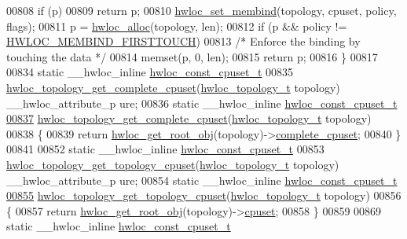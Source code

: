 \begin{DoxyCode}
{{00808   \textcolor{keywordflow}{if} (p)
00809     \textcolor{keywordflow}{return} p;
00810   \hyperlink{a00050_ga8b6d1d90227aff8e44ef26bc1f8a8f95}{hwloc_set_membind}(topology, cpuset, policy, flags);
00811   p = \hyperlink{a00050_gac5586e58cf25c3596b7d4aa31ce13259}{hwloc_alloc}(topology, len);
00812   \textcolor{keywordflow}{if} (p && policy != \hyperlink{a00050_ggac9764f79505775d06407b40f5e4661e8a979c7aa78dd32780858f30f47a72cca0}{HWLOC_MEMBIND_FIRSTTOUCH})
00813     \textcolor{comment}{/* Enforce the binding by touching the data */}
00814     memset(p, 0, len);
00815   \textcolor{keywordflow}{return} p;
00816 \}
00817 
00834 \textcolor{keyword}{static} \_\_hwloc\_inline \hyperlink{a00040_ga1f784433e9b606261f62d1134f6a3b25}{hwloc_const_cpuset_t}
00835 \hyperlink{a00060_ga418ebb39eaf1eac8f9cf4047cf59a534}{hwloc_topology_get_complete_cpuset}(\hyperlink{a00039_ga9d1e76ee15a7dee158b786c30b6a6e38}{hwloc_topology_t} topology) \_\_hwloc\_attribute\_p
      ure;
00836 \textcolor{keyword}{static} \_\_hwloc\_inline \hyperlink{a00040_ga1f784433e9b606261f62d1134f6a3b25}{hwloc_const_cpuset_t}
\hypertarget{a00031_source_l00837}{}\hyperlink{a00060_ga418ebb39eaf1eac8f9cf4047cf59a534}{00837} \hyperlink{a00060_ga418ebb39eaf1eac8f9cf4047cf59a534}{hwloc_topology_get_complete_cpuset}(\hyperlink{a00039_ga9d1e76ee15a7dee158b786c30b6a6e38}{hwloc_topology_t} topology)
00838 \{
00839   \textcolor{keywordflow}{return} \hyperlink{a00053_gadbf58f6e187efbdb3cd9a8e30311b7d7}{hwloc_get_root_obj}(topology)->\hyperlink{a00016_a91788a9da687beb7224cc1fd7b75208c}{complete_cpuset};
00840 \}
00841 
00852 \textcolor{keyword}{static} \_\_hwloc\_inline \hyperlink{a00040_ga1f784433e9b606261f62d1134f6a3b25}{hwloc_const_cpuset_t}
00853 \hyperlink{a00060_gaa319133e702fea664750c45735ac8a25}{hwloc_topology_get_topology_cpuset}(\hyperlink{a00039_ga9d1e76ee15a7dee158b786c30b6a6e38}{hwloc_topology_t} topology) \_\_hwloc\_attribute\_p
      ure;
00854 \textcolor{keyword}{static} \_\_hwloc\_inline \hyperlink{a00040_ga1f784433e9b606261f62d1134f6a3b25}{hwloc_const_cpuset_t}
\hypertarget{a00031_source_l00855}{}\hyperlink{a00060_gaa319133e702fea664750c45735ac8a25}{00855} \hyperlink{a00060_gaa319133e702fea664750c45735ac8a25}{hwloc_topology_get_topology_cpuset}(\hyperlink{a00039_ga9d1e76ee15a7dee158b786c30b6a6e38}{hwloc_topology_t} topology)
00856 \{
00857   \textcolor{keywordflow}{return} \hyperlink{a00053_gadbf58f6e187efbdb3cd9a8e30311b7d7}{hwloc_get_root_obj}(topology)->\hyperlink{a00016_a67925e0f2c47f50408fbdb9bddd0790f}{cpuset};
00858 \}
00859 
00869 \textcolor{keyword}{static} \_\_hwloc\_inline \hyperlink{a00040_ga1f784433e9b606261f62d1134f6a3b25}{hwloc_const_cpuset_t}
}}
\end{DoxyCode}
